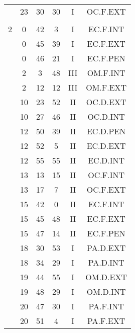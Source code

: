 \documentclass[12pt, a4paper]{article}
\begin{document}
\begin{multicols}{3}
{\begin{tabular}{c c c c c c}
	 	 	 	 & 23 & 30 & 30 & I & OC.F.EXT\\%
	 	 	 	 & & & & & \\%
	 	 	 	2 & 0 & 42 & 3 & I & EC.F.INT\\%
	 	 	 	 & 0 & 45 & 39 & I & EC.F.EXT\\%
	 	 	 	 & 0 & 46 & 21 & I & EC.F.PEN\\%
	 	 	 	 & 2 & 3 & 48 & III & OM.F.INT\\%
	 	 	 	 & 2 & 12 & 12 & III & OM.F.EXT\\%
	 	 	 	 & 10 & 23 & 52 & II & OC.D.EXT\\%
	 	 	 	 & 10 & 27 & 46 & II & OC.D.INT\\%
	 	 	 	 & 12 & 50 & 39 & II & EC.D.PEN\\%
	 	 	 	 & 12 & 52 & 5 & II & EC.D.EXT\\%
	 	 	 	 & 12 & 55 & 55 & II & EC.D.INT\\%
	 	 	 	 & 13 & 13 & 15 & II & OC.F.INT\\%
	 	 	 	 & 13 & 17 & 7 & II & OC.F.EXT\\%
	 	 	 	 & 15 & 42 & 0 & II & EC.F.INT\\%
	 	 	 	 & 15 & 45 & 48 & II & EC.F.EXT\\%
	 	 	 	 & 15 & 47 & 14 & II & EC.F.PEN\\%
	 	 	 	 & 18 & 30 & 53 & I & PA.D.EXT\\%
	 	 	 	 & 18 & 34 & 29 & I & PA.D.INT\\%
	 	 	 	 & 19 & 44 & 55 & I & OM.D.EXT\\%
	 	 	 	 & 19 & 48 & 29 & I & OM.D.INT\\%
	 	 	 	 & 20 & 47 & 30 & I & PA.F.INT\\%
	 	 	 	 & 20 & 51 & 4 & I & PA.F.EXT\\%

\end{tabular}}
\end{multicols}
\end{document}
